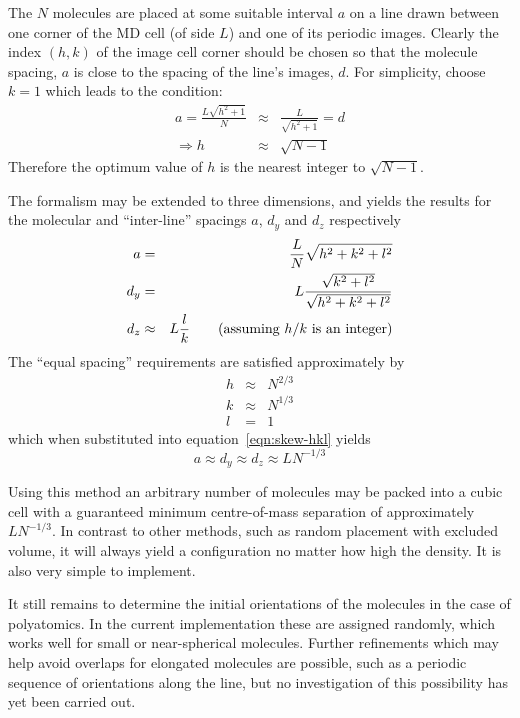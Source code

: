 \documentclass[a4paper,twoside]{report}
\begin{document}
The $N$ molecules are placed at some suitable interval $a$ on a line
drawn between one corner of the MD cell (of side $L$) and one of its
periodic images.  Clearly the index $(h,k)$ of the image cell corner
should be chosen so that the molecule spacing, $a$ is close to the
spacing of the line's images, $d$. For simplicity, choose $k=1$ which
leads to the condition:
\begin{eqnarray}
\nonumber
a = \frac{L \sqrt{h^2+1}}{N} &\approx& \frac{L}{\sqrt{h^2+1}} = d \\
 \Rightarrow h &\approx& \sqrt{N-1}
\end{eqnarray}
Therefore the optimum value of $h$ is the nearest integer to
$\sqrt{N-1}$.  

The formalism may be extended to three dimensions, and yields the
results for the molecular and ``inter-line'' spacings $a$, $d_y$ and
$d_z$ respectively
\begin{eqnarray}
\label{eqn:skew-hkl}
\nonumber
a & = & \frac{L}{N}\sqrt{h^2+k^2+l^2}\\
d_y  & = & L \frac{\sqrt{k^2+l^2}}{\sqrt{h^2+k^2+l^2}} \\
d_z & \approx & L\frac{l}{k} \qquad\textnormal{(assuming $h/k$ is an integer)}
\nonumber
\end{eqnarray}
The ``equal spacing'' requirements are satisfied approximately by
\begin{eqnarray}
  \nonumber
  h & \approx & N^{2/3} \\
  k & \approx & N^{1/3} \\
  \nonumber
  l & = & 1
\end{eqnarray}
which when substituted into equation~\ref{eqn:skew-hkl} yields
\begin{equation}
  a \approx d_y \approx d_z \approx LN^{-1/3}
\end{equation}

Using this method an arbitrary number of molecules may be packed into
a cubic cell with a guaranteed minimum centre-of-mass separation of
approximately $LN^{-1/3}$.  In contrast to other methods, such as
random placement with excluded volume, it will always yield a
configuration no matter how high the density.  It is also very simple
to implement.

It still remains to determine the initial orientations of the
molecules in the case of polyatomics.  In the current implementation
these are assigned randomly, which works well for small or
near-spherical molecules.  Further refinements which may help avoid
overlaps for elongated molecules are possible, such as a periodic
sequence of orientations along the line, but no investigation of this
possibility has yet been carried out.
\end{document}
